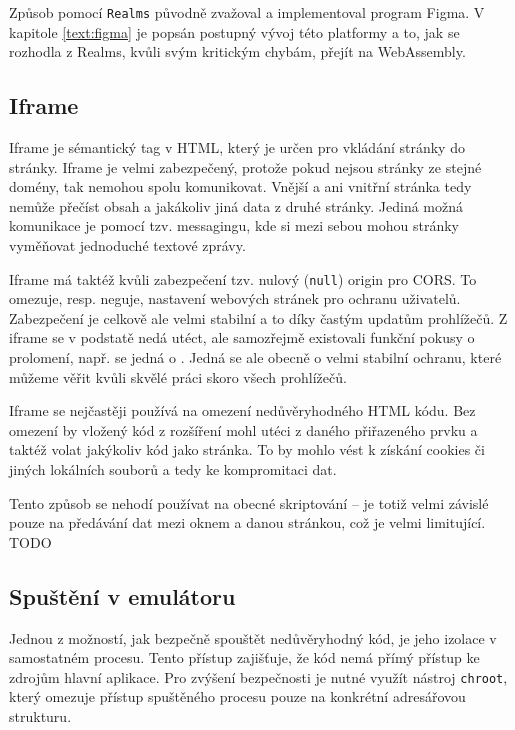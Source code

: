 Způsob pomocí \texttt{Realms} původně zvažoval a implementoval program Figma.
V kapitole \ref{text:figma} je popsán postupný vývoj této platformy a to, jak se rozhodla z Realms, kvůli svým kritickým chybám, přejít na WebAssembly.

\subsection{Iframe}

Iframe je sémantický tag v HTML, který je určen pro vkládání stránky do stránky.
Iframe je velmi zabezpečený, protože pokud nejsou stránky ze stejné domény, tak nemohou spolu komunikovat.
Vnější a ani vnitřní stránka tedy nemůže přečíst obsah a jakákoliv jiná data z druhé stránky.
Jediná možná komunikace je pomocí tzv. messagingu, kde si mezi sebou mohou stránky vyměňovat jednoduché textové zprávy.

Iframe má taktéž kvůli zabezpečení tzv. nulový (\texttt{null}) origin pro CORS.
To omezuje, resp. neguje, nastavení webových stránek pro ochranu uživatelů.
Zabezpečení je celkově ale velmi stabilní a to díky častým updatům prohlížečů.
Z iframe se v podstatě nedá utéct, ale samozřejmě existovali funkční pokusy o prolomení, např. se jedná o \cite{https://issues.chromium.org/issues/40090810}.
Jedná se ale obecně o velmi stabilní ochranu, které můžeme věřit kvůli skvělé práci skoro všech prohlížečů.

Iframe se nejčastěji používá na omezení nedůvěryhodného HTML kódu.
Bez omezení by vložený kód z rozšíření mohl utéci z daného přiřazeného prvku a taktéž volat jakýkoliv kód jako stránka.
To by mohlo vést k získání cookies či jiných lokálních souborů a tedy ke kompromitaci dat.

Tento způsob se nehodí používat na obecné skriptování -- je totiž velmi závislé pouze na předávání dat mezi oknem a danou stránkou, což je velmi limitující.
TODO\todo

\subsection{Spuštění v emulátoru}

Jednou z možností, jak bezpečně spouštět nedůvěryhodný kód, je jeho izolace v samostatném procesu. 
Tento přístup zajišťuje, že kód nemá přímý přístup ke zdrojům hlavní aplikace. 
Pro zvýšení bezpečnosti je nutné využít nástroj \texttt{chroot}, který omezuje přístup spuštěného procesu pouze na konkrétní adresářovou strukturu.


